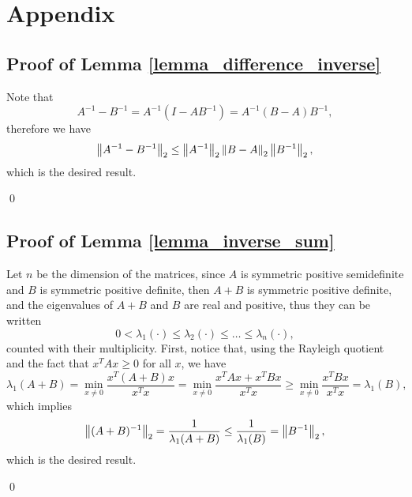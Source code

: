 \section*{Appendix}

\subsection*{Proof of Lemma \ref{lemma_difference_inverse}}

Note that
\[ A^{-1} - B^{-1} = A^{-1} (I - A B^{-1}) = A^{-1} (B - A) B^{-1}, \]
therefore we have
\[ \left\|A^{-1} - B^{-1}\right\|_2 \le \left\|A^{-1}\right\|_2 \left\|B - A\right\|_2 \left\|B^{-1}\right\|_2, \]
which is the desired result.

\qed

\subsection*{Proof of Lemma \ref{lemma_inverse_sum}}

Let $n$ be the dimension of the matrices, since $A$ is symmetric positive semidefinite and $B$ is symmetric positive definite, then $A + B$ is symmetric positive definite, and the eigenvalues of $A + B$ and $B$ are real and positive, thus they can be written
\[ 0 < \lambda_1(\cdot) \le \lambda_2(\cdot) \le \dots \le \lambda_n(\cdot), \]
counted with their multiplicity.
First, notice that, using the Rayleigh quotient and the fact that $x^T A x \ge 0$ for all $x$, we have
\[ \lambda_1(A + B) = \min_{x \neq 0} \frac{x^T(A + B)x}{x^T x} = \min_{x \neq 0} \frac{x^T A x + x^T B x}{x^T x} \ge \min_{x \neq 0} \frac{x^T B x}{x^T x} = \lambda_1(B), \]
which implies
\[ \left\|(A + B)^{-1}\right\|_2 = \frac{1}{\lambda_1(A + B)} \le \frac{1}{\lambda_1(B)} = \left\|B^{-1}\right\|_2, \]
which is the desired result.

\qed

